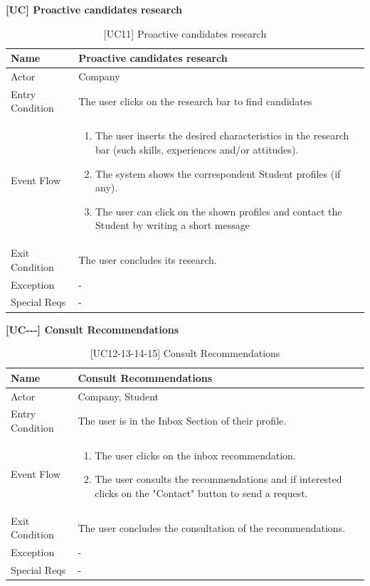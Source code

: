 \textbf{[UC\nextUseCases] Proactive candidates research}
\begin{table}[H] %
    \centering
    \begin{tabular}{|p{3cm}|p{10cm}|}
    \hline
    Name & Proactive candidates research\\ \hline
    Actor  & Company  \\ \hline
    Entry Condition  & The user clicks on the research bar to find candidates \\ \hline
    Event Flow  & 
    \begin{enumerate}[noitemsep, topsep=0pt]
        \item The user inserts the desired characteristics in the research bar (such skills, experiences and/or attitudes).
        \item The system shows the correspondent Student profiles (if any).
        \item The user can click on the shown profiles and contact the Student by writing a short message
    \end{enumerate}
    \\ \hline
    Exit Condition  & The user concludes its research. \\ \hline
    Exception  & - \\ \hline
    Special Reqs  & - \\ \hline
    \end{tabular}
    \caption{[UC11] Proactive candidates research}
\end{table}

\textbf{[UC\nextUseCases-\nextUseCases-\nextUseCases-\nextUseCases] Consult Recommendations}
\begin{table}[H] %
    \centering
    \begin{tabular}{|p{3cm}|p{10cm}|}
    \hline
    Name & Consult Recommendations\\ \hline
    Actor  & Company, Student  \\ \hline
    Entry Condition  & The user is in the Inbox Section of their profile. \\ \hline
    Event Flow  & 
    \begin{enumerate}[noitemsep, topsep=0pt]
        \item The user clicks on the inbox recommendation.
        \item The user consults the recommendations and if interested clicks on the "Contact" button to send a request.
    \end{enumerate}
    \\ \hline
    Exit Condition  & The user concludes the consultation of the recommendations. \\ \hline
    Exception  & - \\ \hline
    Special Reqs  & - \\ \hline
    \end{tabular}
    \caption{[UC12-13-14-15] Consult Recommendations}
\end{table}


